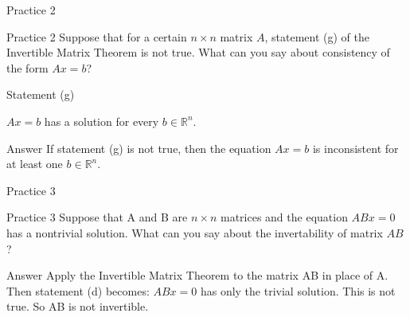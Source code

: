 \begin{frame}{Practice 2}
\begin{alertblock}{Practice 2}
  Suppose that for a certain $n \times n$ matrix $A$, statement (g) of the Invertible Matrix
Theorem is not true. What can you say about consistency of the form $Ax = b$?
\end{alertblock}
\begin{block}{Statement (g)}
  
$Ax = b$ has a solution for every $b \in \mathbb{R}^n$.\pause

\end{block}

\begin{block}{Answer}
  If statement (g) is not true, then the equation $Ax = b$ is inconsistent for at least one $b \in \mathbb{R}^n$.

\end{block}
\end{frame}

\begin{frame}{Practice 3}
  \begin{alertblock}{Practice 3}
    Suppose that A and B are $n \times n$ matrices and the equation $ABx = 0$ has a nontrivial
solution. What can you say about the invertability of matrix $AB$?
  \end{alertblock}\pause
\begin{block}{Answer}
  Apply the Invertible Matrix Theorem to the matrix AB in place of A. Then statement
(d) becomes: $ABx = 0$ has only the trivial solution. This is not true. So AB is not
invertible.
\end{block}
\end{frame}